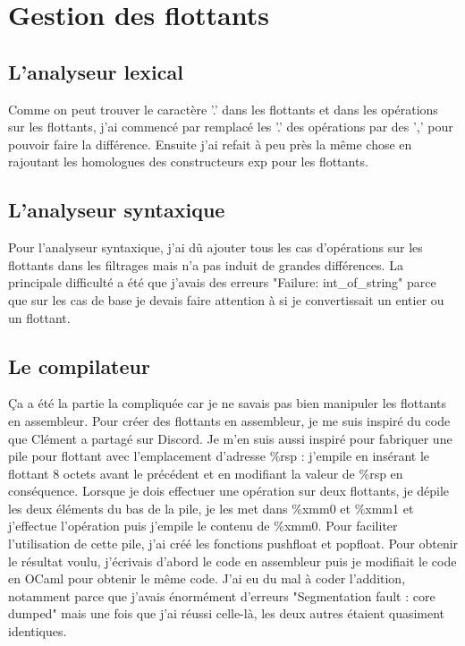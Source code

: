 \documentclass{article}
\begin{document}
\section{Gestion des flottants}

\subsection{L'analyseur lexical}
Comme on peut trouver le caractère '.' dans les flottants et dans les opérations sur les flottants, j'ai commencé par remplacé les '.' des opérations par des ',' pour pouvoir faire la différence. Ensuite j'ai refait à peu près la même chose en rajoutant les homologues des constructeurs exp pour les flottants.

\subsection{L'analyseur syntaxique}
Pour l'analyseur syntaxique, j'ai dû ajouter tous les cas d'opérations sur les flottants dans les filtrages mais n'a pas induit de grandes différences. La principale difficulté a été que j'avais des erreurs "Failure: int\_of\_string" parce que sur les cas de base je devais faire attention à si je convertissait un entier ou un flottant.

\subsection{Le compilateur}
Ça a été la partie la compliquée car je ne savais pas bien manipuler les flottants en assembleur. Pour créer des flottants en assembleur, je me suis inspiré du code que Clément a partagé sur Discord. Je m'en suis aussi inspiré pour fabriquer une pile pour flottant avec l'emplacement d'adresse \%rsp : j'empile en insérant le flottant 8 octets avant le précédent et en modifiant la valeur de \%rsp en conséquence. Lorsque je dois effectuer une opération sur deux flottants, je dépile les deux éléments du bas de la pile, je les met dans \%xmm0 et \%xmm1 et j'effectue l'opération puis j'empile le contenu de \%xmm0. Pour faciliter l'utilisation de cette pile, j'ai créé les fonctions pushfloat et popfloat. Pour obtenir le résultat voulu, j'écrivais d'abord le code en assembleur puis je modifiait le code en OCaml pour obtenir le même code. J'ai eu du mal à coder l'addition, notamment parce que j'avais énormément d'erreurs "Segmentation fault : core dumped" mais une fois que j'ai réussi celle-là, les deux autres étaient quasiment identiques.
\end{document}
